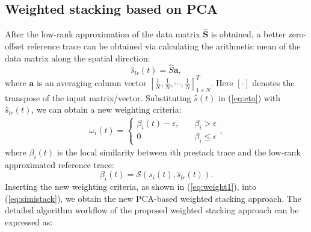 \subsection{Weighted stacking based on PCA} 
After the low-rank approximation of the data matrix $\hat{\mathbf{S}}$ is obtained, a better zero-offset reference trace can be obtained via calculating the arithmetic mean of the data matrix along the spatial direction:
 \begin{equation}
 \label{eq:ave}
\hat{s}_{lr}(t)= \hat{S}\mathbf{a},
 \end{equation}
 where $\mathbf{a}$ is an averaging column vector $[\frac{1}{N},\frac{1}{N},\cdots,\frac{1}{N}]_{1\times N}^T$. Here $[\cdot]$ denotes the transpose of the input matrix/vector.
Substituting $\hat{s}(t)$ in (\ref{eq:eta}) with $\hat{s}_{lr}(t)$, we can obtain a new weighting criteria:
\begin{align}
\label{eq:weight1}
\omega_i(t)=\left\{\begin{array}{cl}
\beta_{i}(t)-\epsilon, & \quad \beta_i>\epsilon \\
0 & \quad \beta_i \le \epsilon
\end{array},\right.
\end{align}
where $\beta_i(t)$ is the local similarity between $i$th prestack trace and the low-rank approximated reference trace:
\begin{equation}
\label{eq:beta}
\beta_i(t) = \mathcal{S}(s_i(t),\hat{s}_{lr}(t)).
\end{equation}
Inserting the new weighting criteria, as shown in (\ref{eq:weight1}), into (\ref{eq:simistack}), we obtain the new PCA-based weighted stacking approach. The detailed algorithm workflow of the proposed weighted stacking approach can be expressed as:


